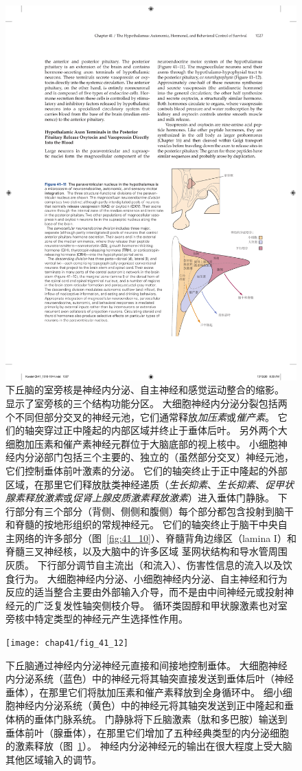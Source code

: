 \begin{figure}[htbp]
	\centering
	\includegraphics[width=0.54\linewidth]{chap41/fig_41_11}
	\caption{下丘脑的室旁核是神经内分泌、自主神经和感觉运动整合的缩影。
		显示了室旁核的三个结构功能分区。
		大细胞神经内分泌分裂包括两个不同但部分交叉的神经元池，它们通常释放\textit{加压素}或\textit{催产素}。
		它们的轴突穿过正中隆起的内部区域并终止于垂体后叶。
		另外两个大细胞加压素和催产素神经元群位于大脑底部的视上核中。
		小细胞神经内分泌部门包括三个主要的、独立的（虽然部分交叉）神经元池，它们控制垂体前叶激素的分泌。
		它们的轴突终止于正中隆起的外部区域，在那里它们释放肽类神经递质（\textit{生长抑素}、\textit{生长抑素}、\textit{促甲状腺素释放激素}或\textit{促肾上腺皮质激素释放激素}）进入垂体门静脉。
		下行部分有三个部分（背侧、侧侧和腹侧）每个部分都包含投射到脑干和脊髓的按地形组织的常规神经元。
		它们的轴突终止于脑干中央自主网络的许多部分（图~\ref{fig:41_10}）、脊髓背角边缘区（lamina I）和脊髓三叉神经核，以及大脑中的许多区域 茎网状结构和导水管周围灰质。
		下行部分调节自主流出（和流入）、伤害性信息的流入以及饮食行为。
		大细胞神经内分泌、小细胞神经内分泌、自主神经和行为反应的适当整合主要由外部输入介导，而不是由中间神经元或投射神经元的广泛复发性轴突侧枝介导。
		循环类固醇和甲状腺激素也对室旁核中特定类型的神经元产生选择性作用。}
	\label{fig:41_11}
\end{figure}


\begin{figure}[htbp]
	\centering
	\texttt{[image: chap41/fig\_41\_12]}
	\caption{下丘脑通过神经内分泌神经元直接和间接地控制垂体。
		大细胞神经内分泌系统（蓝色）中的神经元将其轴突直接发送到垂体后叶（神经垂体），在那里它们将肽加压素和催产素释放到全身循环中。
		细小细胞神经内分泌系统（黄色）中的神经元将其轴突发送到正中隆起和垂体柄的垂体门脉系统。
		门静脉将下丘脑激素（肽和多巴胺）输送到垂体前叶（腺垂体），在那里它们增加了五种经典类型的内分泌细胞的激素释放（图~\ref{fig:41_11}）。
		神经内分泌神经元的输出在很大程度上受大脑其他区域输入的调节。}
	\label{fig:41_12}
\end{figure}


